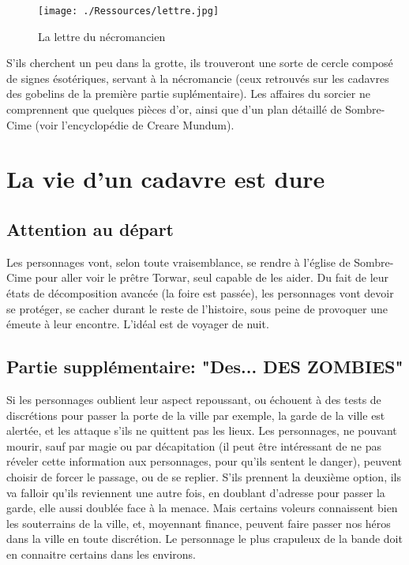 \documentclass[a4paper]{article}
\begin{document}
\begin{figure}[p]
\begin{center}
\hypertarget{lettre}{}
\texttt{[image: ./Ressources/lettre.jpg]}
\caption{La lettre du nécromancien}
\end{center}
\end{figure}
S'ils cherchent un peu dans la grotte, ils trouveront une sorte de cercle composé de signes ésotériques, servant à la nécromancie (ceux retrouvés sur les cadavres des gobelins de la première partie suplémentaire). Les affaires du sorcier ne comprennent que quelques pièces d'or, ainsi que d'un plan détaillé de Sombre-Cime (voir l'encyclopédie de Creare Mundum).

\section{La vie d'un cadavre est dure}
\subsection{Attention au départ}
Les personnages vont, selon toute vraisemblance, se rendre à l'église de Sombre-Cime pour aller voir le prêtre Torwar, seul capable de les aider.
Du fait de leur états de décomposition avancée (la foire est passée), les personnages vont devoir se protéger, se cacher durant le reste de l'histoire, sous peine de provoquer une émeute à leur encontre. L'idéal est de voyager de nuit.
\subsection{Partie supplémentaire: "Des... DES ZOMBIES"} 
Si les personnages oublient leur aspect repoussant, ou échouent à des tests de discrétions pour passer la porte de la ville par exemple, la garde de la ville est alertée, et les attaque s'ils ne quittent pas les lieux. Les personnages, ne pouvant mourir, sauf par magie ou par décapitation (il peut être intéressant de ne pas réveler cette information aux personnages, pour qu'ils sentent le danger), peuvent choisir de forcer le passage, ou de se replier. S'ils prennent la deuxième option, ils va falloir qu'ils reviennent une autre fois, en doublant d'adresse pour passer la garde, elle aussi doublée face à la menace.
\newline
Mais certains voleurs connaissent bien les souterrains de la ville, et, moyennant finance, peuvent faire passer nos héros dans la ville en toute discrétion. Le personnage le plus crapuleux de la bande doit en connaitre certains dans les environs.
\end{document}
